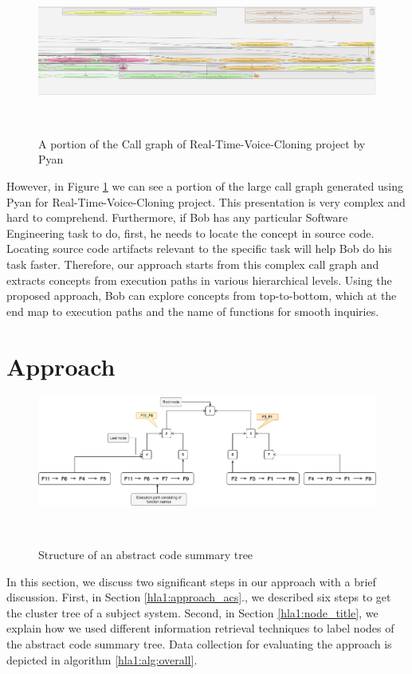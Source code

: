 \begin{figure}[h]
  \centering
  \includegraphics[width=\columnwidth]{figures/hla1/realTime.png}
  \caption{A portion of the Call graph of Real-Time-Voice-Cloning project by Pyan}~\label{fig:realTime}
\end{figure}

However, in Figure \ref{fig:realTime} we can see a portion of the large call graph generated using Pyan \cite{pyan} for Real-Time-Voice-Cloning \cite{realTime} project. This presentation is very complex and hard to comprehend. Furthermore, if Bob has any particular Software Engineering task to do, first, he needs to locate the concept in source code. Locating source code artifacts relevant to the specific task will help Bob do his task faster. Therefore, our approach starts from this complex call graph and extracts concepts from execution paths in various hierarchical levels. Using the proposed approach, Bob can explore concepts from top-to-bottom, which at the end map to execution paths and the name of functions for smooth inquiries. 


 
 
\section{Approach}

\begin{figure}[tb]
  \centering
  \includegraphics[width=\columnwidth]{figures/hla1/visual_tool_static_call_graph-2.png}
  \caption{Structure of an abstract code summary tree}~\label{fig:hla1_motivation}
\end{figure}
In this section, we discuss two significant steps in our approach with a brief discussion. First, in Section \ref{hla1:approach_acs}., we described six steps to get the cluster tree of a subject system. Second, in Section \ref{hla1:node_title}, we explain how we used different information retrieval techniques to label nodes of the abstract code summary tree. Data collection for evaluating the approach is depicted in algorithm \ref{hla1:alg:overall}.


